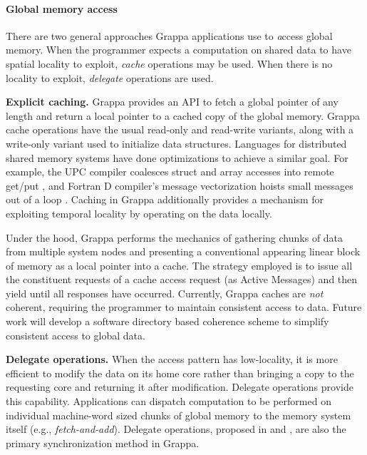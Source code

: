 \paragraph{Global memory access} There are two general approaches
Grappa applications use to {\emph access} global memory. When the
programmer expects a computation on shared data to have spatial locality
to exploit, {\em cache} operations may be used. When there is no
locality to exploit, {\em delegate} operations are used.

\textbf{Explicit caching.} Grappa provides an API to fetch a global
pointer of any length and return a local pointer to a cached copy of the
global memory.  Grappa cache operations have the usual read-only and
read-write variants, along with a write-only variant used to initialize
data structures. Languages for distributed shared memory systems have
done optimizations to achieve a similar goal. For example, the UPC
compiler coalesces struct and array accesses into remote get/put
\cite{Chen:2005}, and Fortran D compiler's message vectorization hoists
small messages out of a loop \cite{FortranD:1992}. Caching in Grappa
additionally provides a mechanism for exploiting temporal locality by
operating on the data locally.
 
Under the hood, Grappa performs the mechanics of gathering chunks of
data from multiple system nodes and presenting a conventional appearing
linear block of memory as a local pointer into a cache. The strategy
employed is to issue all the constituent requests of a cache access
request  (as Active Messages) and then yield until all responses have
occurred.  Currently, Grappa caches are \emph{not} coherent, requiring
the programmer to maintain consistent access to data.  Future work will
develop a software directory based coherence scheme to simplify
consistent access to global data.

\textbf{Delegate operations.} When the access pattern has low-locality,
it is more efficient to modify the data on its home core rather than
bringing a copy to the requesting core and returning it after
modification. Delegate operations provide this capability. Applications
can dispatch computation to be performed on individual machine-word
sized chunks of global memory to the memory system itself (e.g.,
\emph{fetch-and-add}).  Delegate operations, proposed in
\cite{Nelson:hotpar11} and \cite{delegated:oopsla11}, are also the
primary synchronization method in Grappa.

